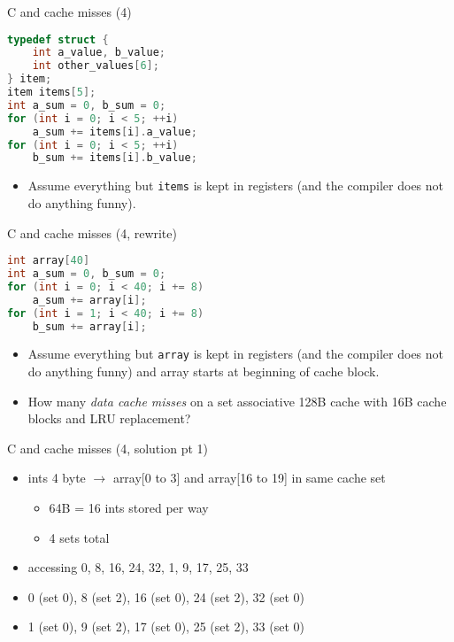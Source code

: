 \begin{frame}[fragile,label=arrayMissesSparse2Alt]{C and cache misses (4)}
\begin{lstlisting}[language=C,style=small]
typedef struct {
    int a_value, b_value;
    int other_values[6];
} item;
item items[5];
int a_sum = 0, b_sum = 0;
for (int i = 0; i < 5; ++i)
    a_sum += items[i].a_value;
for (int i = 0; i < 5; ++i)
    b_sum += items[i].b_value;
\end{lstlisting}
    \begin{itemize}
        \item {\small
    Assume everything but {\tt items} is kept in registers (and the compiler does not do
    anything funny).
        }

    \end{itemize}
\end{frame}

\begin{frame}[fragile,label=arrayMissesSparse2bAlt]{C and cache misses (4, rewrite)}
\begin{lstlisting}[language=C,style=small]
int array[40]
int a_sum = 0, b_sum = 0;
for (int i = 0; i < 40; i += 8)
    a_sum += array[i];
for (int i = 1; i < 40; i += 8)
    b_sum += array[i];
\end{lstlisting}
    \begin{itemize}
        \item {\small
    Assume everything but {\tt array} is kept in registers (and the compiler does not do
    anything funny) and array starts at beginning of cache block.
        }
    \item
How many \textit{data cache misses} on a  set associative 128B cache with 16B cache blocks and
LRU replacement?
    \end{itemize}
\end{frame}


\begin{frame}[fragile,label=arrayMissesSparse2AltSoln1]{C and cache misses (4, solution pt 1)}
    \begin{itemize}
    \item ints 4 byte $\rightarrow$ array[0 to 3] and array[16 to 19] in same cache set
        \begin{itemize}
        \item 64B = 16 ints stored per way
        \item 4 sets total
        \end{itemize}
    \item accessing 0, 8, 16, 24, 32, 1, 9, 17, 25, 33
    \item<2-> 0 (set 0), 8 (set 2), 16 (set 0), 24 (set 2), 32 (set 0)
    \item<2-> 1 (set 0), 9 (set 2), 17 (set 0), 25 (set 2), 33 (set 0)
    \end{itemize}
\end{frame}

